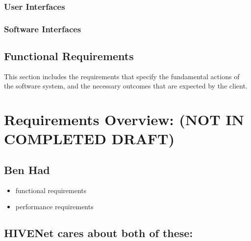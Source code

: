 \documentclass[onecolumn, draftclsnofoot,10pt, compsoc]{IEEEtran}
\begin{document}
		\subsubsection{User Interfaces}
		\subsubsection{Software Interfaces}
	\subsection{Functional Requirements}
This section includes the requirements that specify the fundamental actions of the software system, and the necessary outcomes that are expected by the client.


\section{Requirements Overview: (NOT IN COMPLETED DRAFT)}
\subsection{Ben Had}
\begin{itemize}
		\item functional requirements
		\item performance requirements
	
\end{itemize}
\subsection {HIVENet cares about both of these:}
\end{document}
